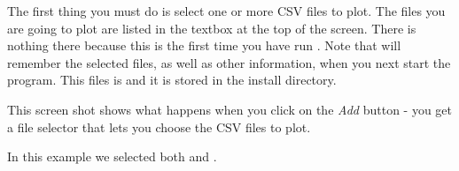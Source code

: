 \documentclass{manual}
\begin{document}
The first thing you must do is select one or more CSV files to plot.  The files you are going to
plot are listed in the textbox at the top of the screen.  There is nothing there because this is
the first time you have run .  Note that  will remember the selected files,
as well as other information, when you next start the program.  This files is  and it is 
stored in the  install directory.

\pagebreak

This screen shot shows what happens when you click on the \emph{Add} button - you get a file selector 
that lets you choose the CSV files to plot.

\begin{figure}[ht]
  \centerline{}
  \label{fig:winsetpath1}
\end{figure}

\pagebreak

In this example we selected both  and .
\end{document}
